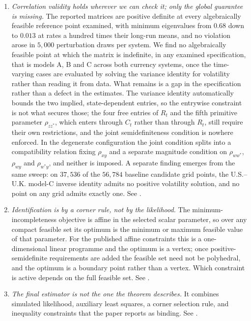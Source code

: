 \documentclass[11pt]{article}
\theoremstyle{definition}
\begin{document}
\begin{enumerate}[label=(\roman*)]
\item \emph{Correlation validity holds wherever we can check it; only the global guarantee is missing.} The reported matrices are positive definite at every algebraically feasible reference point examined, with minimum eigenvalues from $0.68$ down to $0.013$ at rates a hundred times their long-run means, and no violation arose in $5{,}000$ perturbation draws per system. We find no algebraically feasible point at which the matrix is indefinite, in any examined specification, that is models A, B and C across both currency systems, once the time-varying cases are evaluated by solving the variance identity for volatility rather than reading it from data. What remains is a gap in the specification rather than a defect in the estimates. The variance identity automatically bounds the two implied, state-dependent entries, so the entrywise constraint is not what secures those; the four free entries of $R_t$ and the fifth primitive parameter $\rho_{zz^*}$, which enters through $C_t$ rather than through $R_t$, still require their own restrictions, and the joint semidefiniteness condition is nowhere enforced. In the degenerate configuration the joint condition splits into a compatibility relation fixing $\rho_{xy}$ and a separate magnitude condition on $\rho_{ww^*}$, $\rho_{wy}$ and $\rho_{w^*y}$, and neither is imposed. A separate finding emerges from the same sweep: on $37{,}536$ of the $56{,}784$ baseline candidate grid points, the U.S.--U.K. model-C inverse identity admits no positive volatility solution, and no point on any grid admits exactly one. See .
\item \emph{Identification is by a corner rule, not by the likelihood.} The minimum-incompleteness objective is affine in the selected scalar parameter, so over any compact feasible set its optimum is the minimum or maximum feasible value of that parameter. For the published affine constraints this is a one-dimensional linear programme and the optimum is a vertex; once positive-semidefinite requirements are added the feasible set need not be polyhedral, and the optimum is a boundary point rather than a vertex. Which constraint is active depends on the full feasible set. See .
\item \emph{The final estimator is not the one the theorem describes.} It combines simulated likelihood, auxiliary least squares, a corner selection rule, and inequality constraints that the paper reports as binding. See .
\end{enumerate}
\end{document}
